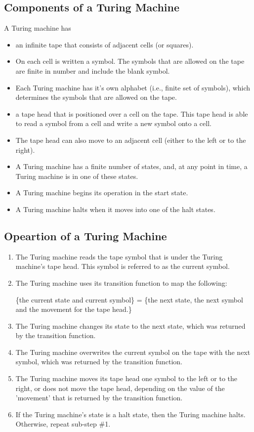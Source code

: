 \documentclass[12pt]{article}
\begin{document}
\subsection{Components of a Turing Machine}
A Turing machine has
\begin{itemize}
\item an infinite tape that consists of adjacent cells (or squares). 
\item On each cell is written a symbol. The symbols that are allowed on the tape are finite in number and include the blank symbol. 
\item Each Turing machine has it's own alphabet (i.e., finite set of symbols), which determines the symbols that are allowed on the tape.
\item a tape head that is positioned over a cell on the tape. This tape head is able to read a symbol from a cell and write a new symbol onto a cell. 
\item The tape head can also move to an adjacent cell (either to the left or to the right).
\item A Turing machine has a finite number of states, and, at any point in time, a Turing machine is in one of these states. 
\item A Turing machine begins its operation in the start state. 
\item A Turing machine halts when it moves into one of the halt states.
\end{itemize} 
\pagebreak
\subsection{Opeartion of a Turing Machine}
\begin{enumerate}
\item The Turing machine reads the tape symbol that is under the Turing machine's tape head. This symbol is referred to as the current symbol.
\item The Turing machine uses its transition function to map the following: 
\begin{center}
\{the current state and current symbol\} =  \{the next state, the next symbol and the movement for the tape head.\}
\end{center}
\item The Turing machine changes its state to the next state, which was returned by the transition function.
\item The Turing machine overwrites the current symbol on the tape with the next symbol, which was returned by the transition function.
\item The Turing machine moves its tape head one symbol to the left or to the right, or does not move the tape head, depending on the value of the 'movement' that is returned by the transition function.
\item If the Turing machine's state is a halt state, then the Turing machine halts. Otherwise, repeat sub-step \#1.
\end{enumerate}
\end{document}
